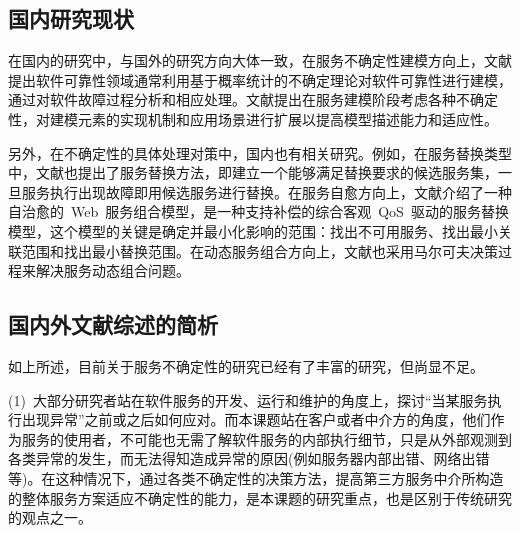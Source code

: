 %


\subsection{国内研究现状}

在国内的研究中，与国外的研究方向大体一致，在服务不确定性建模方向上，文献\cite{zhangyongqiang2006}提出软件可靠性领域通常利用基于概率统计的不确定理论对软件可靠性进行建模，通过对软件故障过程分析和相应处理。文献\cite{fan2002service}提出在服务建模阶段考虑各种不确定性，对建模元素的实现机制和应用场景进行扩展以提高模型描述能力和适应性。

另外，在不确定性的具体处理对策中，国内也有相关研究。例如，在服务替换类型中，文献\cite{guo2007angel}也提出了服务替换方法，即建立一个能够满足替换要求的候选服务集，一旦服务执行出现故障即用候选服务进行替换。在服务自愈方向上，文献\cite{yin2009self}介绍了一种自治愈的~Web~服务组合模型，是一种支持补偿的综合客观~QoS~驱动的服务替换模型，这个模型的关键是确定并最小化影响的范围：找出不可用服务、找出最小关联范围和找出最小替换范围。在动态服务组合方向上，文献\cite{gao2005web}也采用马尔可夫决策过程来解决服务动态组合问题。

\subsection{国内外文献综述的简析}
如上所述，目前关于服务不确定性的研究已经有了丰富的研究，但尚显不足。

(1)~大部分研究者站在软件服务的开发、运行和维护的角度上，探讨“当某服务执行出现异常”之前或之后如何应对。而本课题站在客户或者中介方的角度，他们作为服务的使用者，不可能也无需了解软件服务的内部执行细节，只是从外部观测到各类异常的发生，而无法得知造成异常的原因(例如服务器内部出错、网络出错等)。在这种情况下，通过各类不确定性的决策方法，提高第三方服务中介所构造的整体服务方案适应不确定性的能力，是本课题的研究重点，也是区别于传统研究的观点之一。

